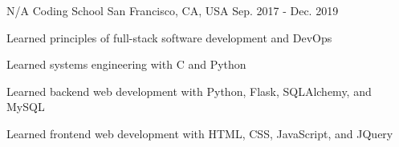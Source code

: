 

\begin{cventries}

	\cventry
	{N/A} %
	{Coding School} %
	{San Francisco, CA, USA} %
	{Sep. 2017 - Dec. 2019} %
	{
		\begin{cvitems} %
			\item {Learned principles of full-stack software development and DevOps}
			\item {Learned systems engineering with C and Python}
			\item {Learned backend web development with Python, Flask, SQLAlchemy, and MySQL}
			\item {Learned frontend web development with HTML, CSS, JavaScript, and JQuery}
		\end{cvitems}
	}

\end{cventries}
